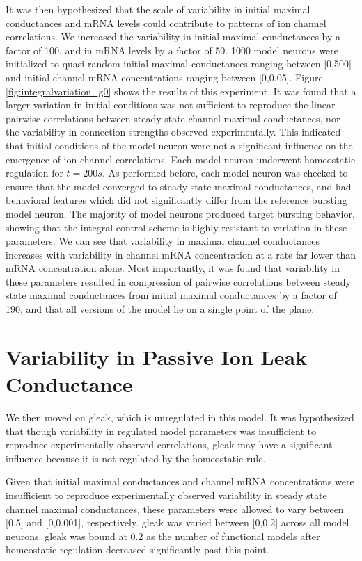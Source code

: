 It was then hypothesized that the scale of variability in initial maximal conductances and mRNA levels could contribute to patterns of ion channel correlations. We increased the variability in initial maximal conductances by a factor of 100, and in mRNA levels by a factor of 50. 1000 model neurons were initialized to quasi-random initial maximal conductances ranging between [0,500] and initial channel mRNA concentrations ranging between [0,0.05].
Figure \ref{fig:integralvariation_g0} shows the results of this experiment. It was found that a larger variation in initial conditions was not sufficient to reproduce the linear pairwise correlations between steady state channel maximal conductances, nor the variability in connection strengths observed experimentally. This indicated that initial conditions of the model neuron were not a significant influence on the emergence of ion channel correlations. Each model neuron underwent homeostatic regulation for $t = 200s$. As performed before, each model neuron was checked to ensure that the model converged to steady state maximal conductances, and had behavioral features which did not significantly differ from the reference bursting model neuron. The majority of model neurons produced target bursting behavior, showing that the integral control scheme is highly resistant to variation in these parameters. We can see that variability in maximal channel conductances increases with variability in channel mRNA concentration at a rate far lower than mRNA concentration alone. Most importantly, it was found that variability in these parameters resulted in compression of pairwise correlations between steady state maximal conductances from initial maximal conductances by a factor of 190, and that all versions of the model lie on a single point of the plane.

\section{Variability in Passive Ion Leak Conductance}

We then moved on \acf{gleak}, which is unregulated in this model. It was hypothesized that though variability in regulated model parameters was insufficient to reproduce experimentally observed correlations, \ac{gleak} may have a significant influence because it is not regulated by the homeostatic rule.

Given that initial maximal conductances and channel mRNA concentrations were insufficient to reproduce experimentally observed variability in steady state channel maximal conductances, these parameters were allowed to vary between [0,5] and [0,0.001], respectively. \ac{gleak} was varied between [0,0.2] across all model neurons. \ac{gleak} was bound at 0.2 as the number of functional models after homeostatic regulation decreased significantly past this point.

